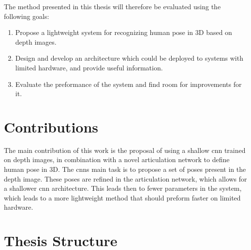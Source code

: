 The method presented in this thesis will therefore be evaluated using the following goals:



\begin{enumerate}
\item Propose a lightweight system for recognizing human pose in 3D based on depth images. 
\item Design and develop an architecture which could be deployed to systems with limited hardware, and provide useful information.
\item Evaluate the preformance of the system and find room for improvements for it.
\end{enumerate}

\section{Contributions}

The main contribution of this work is the proposal of using a shallow \gls{cnn} trained on depth images, in combination with a novel articulation network to define human pose in 3D. The \gls{cnn}s main task is to propose a set of poses present in the depth image. These poses are refined in the articulation network, which allows for a shallower \gls{cnn} architecture. This leads then to fewer parameters in the system, which leads to a more lightweight method that should preform faster on limited hardware.

\section{Thesis Structure}



